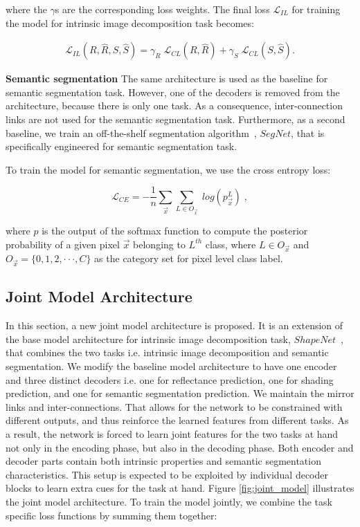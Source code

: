 \documentclass[runningheads]{llncs}
\begin{document}
\noindent where the $\gamma$s are the corresponding loss weights. The final loss $\mathcal{L}_{IL}$ for training the model for intrinsic image decomposition task becomes:

\begin{equation} \label{eq:CL2}
\begin{aligned}
\mathcal{L}_{IL}(R, \hat{R}, S, \hat{S}) = \gamma_{R} \; \mathcal{L}_{CL}(R, \hat{R}) + \gamma_{S} \; \mathcal{L}_{CL}(S, \hat{S}).
\end{aligned}
\end{equation}

\noindent \textbf{Semantic segmentation} The same architecture is used as the baseline for semantic segmentation task. However, one of the decoders is removed from the architecture, because there is only one task. As a consequence, inter-connection links are not used for the semantic segmentation task. Furthermore, as a second baseline, we train an off-the-shelf segmentation algorithm~\cite{segnet}, $SegNet$, that is specifically engineered for semantic segmentation task.  

To train the model for semantic segmentation, we use the cross entropy loss:

\begin{equation} \label{eq:ce}
\mathcal{L}_{CE} = - \frac{1}{n} \sum_{\vec{x}}^{} \sum_{L \in O_{\vec{x}}}^{} \;log(p_{\vec{x}}^{L}) \; ,
\end{equation}

\noindent where $p$ is the output of the softmax function to compute the posterior probability of a given pixel $\vec{x}$ belonging to $L^{th}$ class, where $L \in O_{\vec{x}}$ and $O_{\vec{x}} = \{0, 1, 2, \cdot \cdot \cdot , C\}$ as the category set for pixel level class label.

\subsection{Joint Model Architecture}
In this section, a new joint model architecture is proposed. It is an extension of the base model architecture for intrinsic image decomposition task, $ShapeNet$~\cite{shi}, that combines the two tasks i.e. intrinsic image decomposition and semantic segmentation. We modify the baseline model architecture to have one encoder and three distinct decoders i.e. one for reflectance prediction, one for shading prediction, and one for semantic segmentation prediction. We maintain the mirror links and inter-connections. That allows for the network to be constrained with different outputs, and thus reinforce the learned features from different tasks. As a result, the network is forced to learn joint features for the two tasks at hand not only in the encoding phase, but also in the decoding phase. Both encoder and decoder parts contain both intrinsic properties and semantic segmentation characteristics. This setup is expected to be exploited by individual decoder blocks to learn extra cues for the task at hand. Figure \ref{fig:joint_model} illustrates the joint model architecture. To train the model jointly, we combine the task specific loss functions by summing them together:
\end{document}
